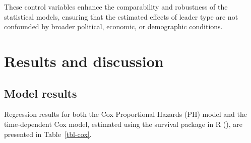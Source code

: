 \documentclass[
  12pt,
]{report}
\begin{document}
These control variables enhance the comparability and robustness of the
statistical models, ensuring that the estimated effects of leader type
are not confounded by broader political, economic, or demographic
conditions.

\section{Results and discussion}\label{results-and-discussion}

\subsection{Model results}\label{model-results}

Regression results for both the Cox Proportional Hazards (PH) model and
the time-dependent Cox model, estimated using the survival package in R
(), are presented in
Table~\ref{tbl-cox}.
\end{document}
